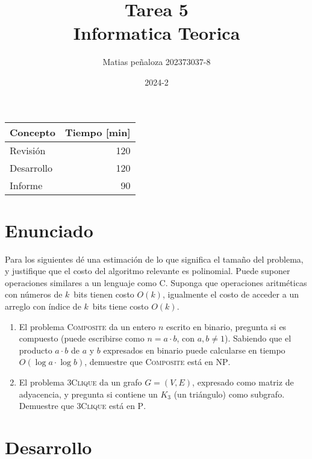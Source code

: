 \documentclass[spanish, draft]{article}
\begin{document}
\title{
    Tarea 5 \\
    Informatica Teorica
}
\author{
    Matias peñaloza
    202373037-8
}
\date{
    2024-2
}
\maketitle

\begin{center}
  \begin{tabular}{|l|r|}
    \hline
    \multicolumn{1}{|c|}{\textbf{Concepto}} &
      \multicolumn{1}{c|}{\textbf{Tiempo [min]}} \\
    \hline
    Revisión & 120\\
    \hline
    Desarrollo    & 120\\
    \hline
    Informe	      & 90\\
    \hline
  \end{tabular}
\end{center}

\section{Enunciado}
Para los siguientes dé una estimación
de lo que significa el tamaño del problema,
y justifique que el costo del algoritmo relevante es polinomial.
Puede suponer operaciones similares a un lenguaje como C.
Suponga que operaciones aritméticas con números de \(k\)~bits
tienen costo \(O(k)\),
igualmente el costo de acceder a un arreglo con índice de \(k\)~bits
tiene costo \(O(k)\).
\begin{enumerate}
\item %
  El problema \textsc{Composite} da un entero \(n\) escrito en binario,
  pregunta si es compuesto
  (puede escribirse como \(n = a \cdot b\), con \(a, b \ne 1\)).
  Sabiendo que el producto \(a \cdot b\)
  de \(a\) y \(b\) expresados en binario
  puede calcularse en tiempo \(O(\log a \cdot \log b)\),
  demuestre que \textsc{Composite} está en \textsc{NP}.
\item %
  El problema \textsc{3Clique} da un grafo \(G = (V, E)\),
  expresado como matriz de adyacencia,
  y pregunta si contiene un \(K_3\)
  (un triángulo)
  como subgrafo.
  Demuestre que \textsc{3Clique} está en \textsc{P}.
\end{enumerate}

\section{Desarrollo}
    
\end{document}
